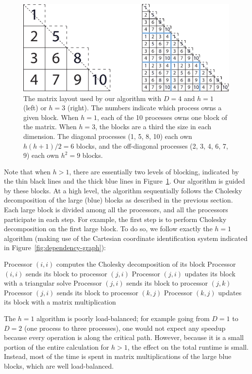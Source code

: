 \documentclass[12pt]{article}
\begin{document}
\begin{figure}
  \centering
  \includegraphics[scale=.75]{figs/vary-h}
  \caption{The matrix layout used by our algorithm with \(D=4\) and \(h=1\) (left) or \(h=3\) (right).  The numbers indicate which process owns a given block.  When \(h=1\), each of the 10 processes owns one block of the matrix.  When \(h=3\), the blocks are a third the size in each dimension.  The diagonal processes (1, 5, 8, 10) each own \(h(h+1)/2=6\) blocks, and the off-diagonal processes (2, 3, 4, 6, 7, 9) each own \(h^2=9\) blocks.}
  \label{fig:matrix-vary-h}
\end{figure}


Note that when \(h>1\), there are essentially two levels of blocking, indicated by the thin black lines and the thick blue lines in Figure~\ref{fig:matrix-vary-h}.  Our algorithm is guided by these blocks.  At a high level, the algorithm sequentially follows the Cholesky decomposition of the large (blue) blocks as described in the previous section.  Each large block is divided among all the processors, and all the processors participate in each step.  For example, the first step is to perform Cholesky decomposition on the first large block.  To do so, we follow exactly the \(h=1\) algorithm (making use of the Cartesian coordinate identification system indicated in Figure~\ref{fig:dependency-graph}):
\begin{algorithmic}[1]
\State Processor $(i,i)$ computes the Cholesky decomposition of its block
\State Processor $(i,i)$ sends its block to processor $(j,i)$
\State Processor $(j,i)$ updates its block with a triangular solve
   \State Processor $(j,i)$ sends its block to processor $(j,k)$
 \Else
   \State Processor $(j,i)$ sends its block to processor $(k,j)$
 \EndIf
 \EndParFor
\EndParFor
{}
  \State Processor $(k,j)$ updates its block with a matrix multiplication
 \EndParFor
\EndParFor
\EndFor
\end{algorithmic}
The \(h=1\) algorithm is poorly load-balanced; for example going from $D=1$ to $D=2$ (one process to three processes), one would not expect any speedup because every operation is along the critical path.  However, because it is a small portion of the entire calculation for $h>1$, the effect on the total runtime is small.  Instead, most of the time is spent in matrix multiplications of the large blue blocks, which are well load-balanced.
\end{document}
